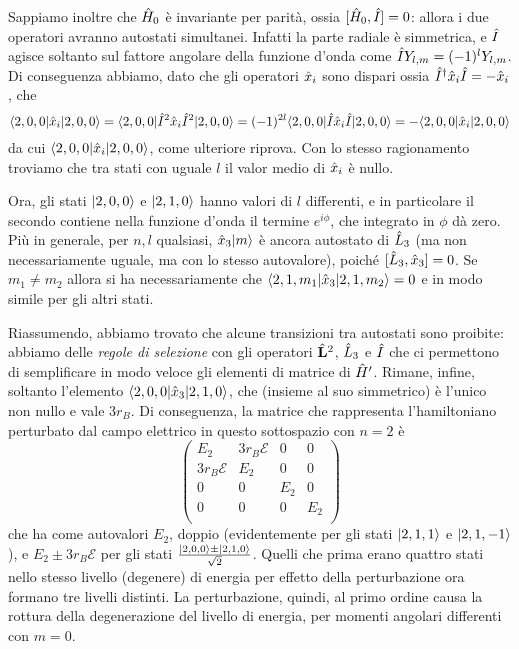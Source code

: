 Sappiamo inoltre che $\hat{H}_0$ è invariante per parità, ossia $[\hat{H}_0,\hat{I}]=0$: allora i due operatori avranno autostati simultanei.
Infatti la parte radiale è simmetrica, e $\hat{I}$ agisce soltanto sul fattore angolare della funzione d'onda come $\hat{I}Y_{l,m}=(-1)^lY_{l,m}$.
Di conseguenza abbiamo, dato che gli operatori $\hat{x}_i$ sono dispari ossia $\hat{I}^\dagger\hat{x}_i\hat{I}=-\hat{x}_i$, che
\begin{equation}
	\langle2,0,0\rvert\hat{x}_i\lvert2,0,0\rangle=
	\langle2,0,0\rvert\hat{I}^2\hat{x}_i\hat{I}^2\lvert2,0,0\rangle=
	(-1)^{2l}\langle2,0,0\rvert\hat{I}\hat{x}_i\hat{I}\lvert2,0,0\rangle=
	-\langle2,0,0\rvert\hat{x}_i\lvert2,0,0\rangle
\end{equation}
da cui $\langle2,0,0\rvert\hat{x}_i\lvert2,0,0\rangle$, come ulteriore riprova.
Con lo stesso ragionamento troviamo che tra stati con uguale $l$ il valor medio di $\hat{x}_i$ è nullo.

Ora, gli stati $\lvert2,0,0\rangle$ e $\lvert2,1,0\rangle$ hanno valori di $l$ differenti, e in particolare il secondo contiene nella funzione d'onda il termine $e^{i\phi}$, che integrato in $\phi$ dà zero.
Più in generale, per $n,l$ qualsiasi, $\hat{x}_3\lvert m\rangle$ è ancora autostato di $\hat{L}_3$ (ma non necessariamente uguale, ma con lo stesso autovalore), poich\'e $[\hat{L}_3,\hat{x}_3]=0$.
Se $m_1\ne m_2$ allora si ha necessariamente che $\langle2,1,m_1\rvert\hat{x}_3\lvert2,1,m_2\rangle=0$ e in modo simile per gli altri stati.

Riassumendo, abbiamo trovato che alcune transizioni tra autostati sono proibite: abbiamo delle \emph{regole di selezione} con gli operatori $\hat{\mathbf{L}}^2$, $\hat{L}_3$ e $\hat{I}$ che ci permettono di semplificare in modo veloce gli elementi di matrice di $\hat{H}'$.
Rimane, infine, soltanto l'elemento $\langle2,0,0\rvert\hat{x}_3\lvert2,1,0\rangle$, che (insieme al suo simmetrico) è l'unico non nullo e vale $3r_B$.
Di conseguenza, la matrice che rappresenta l'hamiltoniano perturbato dal campo elettrico in questo sottospazio con $n=2$ è
\begin{equation}
	\begin{pmatrix}
		E_2				&3r_B\mathcal E	&0		&0	\\
		3r_B\mathcal E	&E_2			&0		&0	\\
		0				&0				&E_2	&0	\\
		0				&0				&0		&E_2\\
	\end{pmatrix}
\end{equation}
che ha come autovalori $E_2$, doppio (evidentemente per gli stati $\lvert2,1,1\rangle$ e $\lvert2,1,-1\rangle$), e $E_2\pm 3r_B\mathcal E$ per gli stati $\frac{\lvert2,0,0\rangle\pm\lvert2,1,0\rangle}{\sqrt{2}}$.
Quelli che prima erano quattro stati nello stesso livello (degenere) di energia per effetto della perturbazione ora formano tre livelli distinti.
La perturbazione, quindi, al primo ordine causa la rottura della degenerazione del livello di energia, per momenti angolari differenti con $m=0$.

